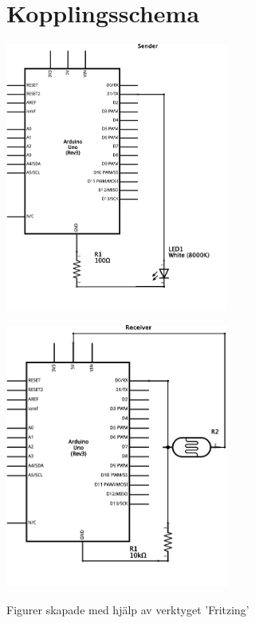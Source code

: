 \section{Kopplingsschema} %
\label{sec:kopplingsschema}
\begin{center}
    \includegraphics[width=0.55\textwidth]{res/img/sender_schem}
\end{center}

\begin{center}
    \includegraphics[width=0.55\textwidth]{res/img/receiver_schem}
\end{center}
\vfill
\begin{center}
    \tiny{Figurer skapade med hjälp av verktyget 'Fritzing'}    
\end{center}

